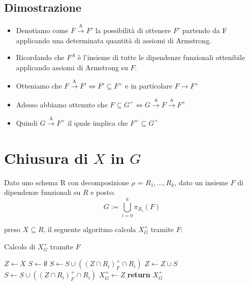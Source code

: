 \documentclass{article}
\begin{document}
\subsection{Dimostrazione}
\begin{itemize}
  \item Denotiamo come $F \xrightarrow{\text{A}} F'$ la possibilità di ottenere $F'$ partendo da F applicando una determinata quantità di assiomi di Armstrong.
  \item  Ricordando che $F^A$ è l'insieme di tutte le dipendenze funzionali ottenibile applicando assiomi di Armstrong su $F$.
  \item Otteniamo che $F \xrightarrow{\text{A}} F' \Leftrightarrow F' \subseteq F^+$ e in particolare $F \rightarrow F^+$
  \item Adesso abbiamo ottenuto che $F \subseteq G^+ \Leftrightarrow G \xrightarrow{\text{A}} F \xrightarrow{\text{A}} F^+$ 
  \item Quindi $G \xrightarrow{\text{A}} F^+$ il quale implica che \textbf{$F^+ \subseteq G^+$}

\end{itemize}







\pagebreak
\section{Chiusura di $X$ in $G$}
Dato uno schema R con decomposizione $\rho$ = $R_1,...,R_k$, dato un insieme $F$ di dipendenze funzionali su $R$ e posto:
\[ G := \bigcup_{i=0}^{k} \pi_{R_i}(F) \]\par
preso $X \subseteq R$, il seguente algoritmo calcola $X_G^+$ tramite $F$:
\begin{algorithm}
  \caption{Calcolo di $X_G^+$ tramite $F$}
  \begin{algorithmic}[1]
          \State $Z \gets X$
          \State $S \gets \emptyset$
              \State $S \gets S \cup ((Z \cap R_i)^+_F \cap R_i)$
          \EndFor
              \State $Z \gets Z \cup S$
                  \State $S \gets S \cup ((Z \cap R_i)^+_F \cap R_i)$
              \EndFor
          \EndWhile
          \State $X_G^+ \gets Z$
          \State \textbf{return} $X_G^+$
      \EndProcedure
  \end{algorithmic}
\end{algorithm}
\end{document}
